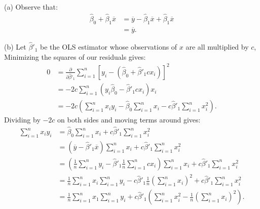 \documentclass[11pt,twoside,openany]{memoir}
\begin{document}
        \begin{answer}
            (a) Observe that:
                \begin{equation*}
                \begin{split}
                    \hat{\beta}_0 + \hat{\beta}_1 \overline{x}
                    & = \overline{y} - \hat{\beta}_1 \overline{x} + \hat{\beta}_1\overline{x} \\
                    & = \overline{y}.
                \end{split}
                \end{equation*}

            (b) Let $\hat{\beta}'_1$ be the OLS estimator whose observations of $x$ are all multiplied by $c$, Minimizing the squares of our residuals gives:
                \begin{equation*}
                \begin{split}
                    0
                    & = \frac{\partial}{\partial \hat{\beta}'_1} \sum_{i = 1}^n \left[ y_i - (\hat{\beta}_0 + \hat{\beta}'_1 cx_i) \right]^2 \\
                    & = -2c \sum_{i = 1}^n (y_i \hat{\beta}_0 - \hat{\beta}'_1 cx_i)x_i \\
                    & = -2c \left( \sum_{i = 1}^n x_i y_i - \hat{\beta}_0 \sum_{i = 1}^n x_i - c\hat{\beta}'_1 \sum_{i = 1}^n x_i^2 \right).
                \end{split}
                \end{equation*}
            Dividing by $-2c$ on both sides and moving terms around gives:
                \begin{equation*}
                \begin{split}
                    \sum_{i  =1}^n x_i y_i &= \hat{\beta}_0 \sum_{i = 1}^n x_i + c\hat{\beta}'_1 \sum_{i = 1}^n x_i^2 \\
                    & = (\overline{y} - \hat{\beta}'_1 \overline{x})\sum_{i = 1}^n x_i + c\hat{\beta}'_1 \sum_{i = 1}^n x_i^2 \\
                    & = \left( \frac{1}{n} \sum_{i = 1}^n y_i - \hat{\beta}'_1 \frac{1}{n}\sum_{i = 1}^n cx_i \right)\sum_{i = 1}^n x_i + c\hat{\beta}'_1 \sum_{i = 1}^n x_i^2 \\
                    & = \frac{1}{n}\sum_{i = 1}^n x_i \sum_{i = 1}^n y_i - c\hat{\beta}'_1 \frac{1}{n}\left( \sum_{i = 1}^n x_i \right)^2 + c\hat{\beta}'_1 \sum_{i = 1}^n x_i^2 \\
                    & = \frac{1}{n}\sum_{i = 1}^n x_1 \sum_{i = 1}^n y_i + c\hat{\beta}'_1 \left( \sum_{i = 1}^n x_i^2 - \frac{1}{n}\left( \sum_{i = 1}^n x_i \right)^2 \right).

\end{split}
\end{equation*}
\end{answer}
\end{document}
